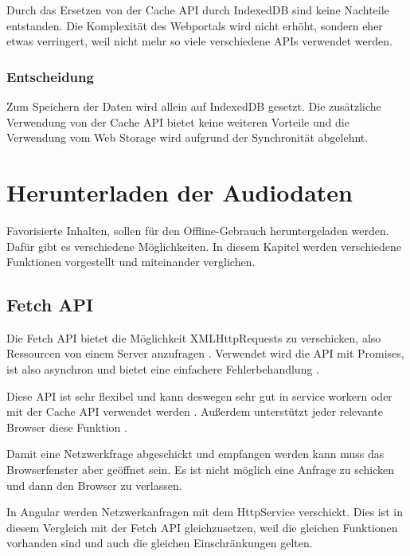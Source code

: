 
Durch das Ersetzen von der Cache \ac{API} durch IndexedDB sind keine Nachteile entstanden. Die Komplexität des Webportals wird nicht erhöht, sondern eher etwas verringert, weil nicht mehr so viele verschiedene \acp{API} verwendet werden.

\subsubsection{Entscheidung}
Zum Speichern der Daten wird allein auf IndexedDB gesetzt. Die zusätzliche Verwendung von der Cache \ac{API} bietet keine weiteren Vorteile und die Verwendung vom Web Storage wird aufgrund der Synchronität abgelehnt.  

\clearpage

\section{Herunterladen der Audiodaten}
Favorisierte Inhalten, sollen für den Offline-Gebrauch heruntergeladen werden. Dafür gibt es verschiedene Möglichkeiten. In diesem Kapitel werden verschiedene Funktionen vorgestellt und miteinander verglichen. 

\subsection{Fetch API}
Die Fetch \ac{API} bietet die Möglichkeit XMLHttpRequests zu verschicken, also Ressourcen von einem Server anzufragen \autocite{Rojas2020}. Verwendet wird die \ac{API} mit Promises, ist also asynchron und bietet eine einfachere Fehlerbehandlung \autocite{Rojas2020} \autocite{mdn-fetch}. 

Diese \ac{API} ist sehr flexibel und kann deswegen sehr gut in service workern oder mit der Cache \ac{API} verwendet werden \autocite{mdn-fetch}. Außerdem unterstützt jeder relevante Browser diese Funktion \autocite{mdn-fetch}. 

Damit eine Netzwerkfrage abgeschickt und empfangen werden kann muss das Browserfenster aber geöffnet sein. Es ist nicht möglich eine Anfrage zu schicken und dann den Browser zu verlassen.

In Angular werden Netzwerkanfragen mit dem HttpService verschickt. Dies ist in diesem Vergleich mit der Fetch \ac{API} gleichzusetzen, weil die gleichen Funktionen vorhanden sind und auch die gleichen Einschränkungen gelten.


